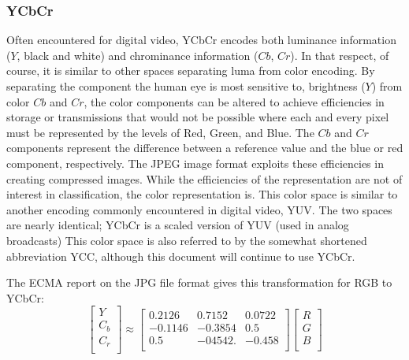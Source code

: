 \documentclass[letterpaper]{article}
\begin{document}
{\subsubsection{YCbCr}
Often encountered for digital video, YCbCr encodes both luminance information ($Y$, black and white) and chrominance information ($Cb$, $Cr$). In that respect, of course, it is similar to other spaces separating luma from color encoding. By separating the component the human eye is most sensitive to, brightness ($Y$) from color $Cb$ and $Cr$, the color components can be altered to achieve efficiencies in storage or transmissions that would not be possible where each and every pixel must be represented by the levels of Red, Green, and Blue.  The $Cb$ and $Cr$ components represent the difference between a reference value and the blue or red component, respectively. The JPEG image format exploits these efficiencies in creating compressed images. While the efficiencies of the representation are not of interest in classification, the color representation is. This color space is similar to another encoding commonly encountered in digital video, YUV. The two spaces are nearly identical; YCbCr is a scaled version of YUV (used in analog broadcasts) This color space is also referred to by the somewhat shortened abbreviation YCC, although this document will continue to use YCbCr.

The ECMA report on the JPG file format gives this transformation for RGB to YCbCr:
\nocite{Ecma2019-yo}
\begin{equation}
	\begin{bmatrix}
	Y \\[0.3em]
	C_b \\[0.3em]
	C_r \\[0.3em]
	\end{bmatrix}
	\approx
	\begin{bmatrix}
	0.2126 & 0.7152 & 0.0722 \\[0.3em]
	-0.1146 & -0.3854 & 0.5 \\[0.3em]
	0.5 & -04542. & -0.458 \\[0.3em]
	\end{bmatrix}
	\begin{bmatrix}
	R \\[0.3em]
	G \\[0.3em]
	B \\[0.3em]
	\end{bmatrix}	
\end{equation}




}
\end{document}
